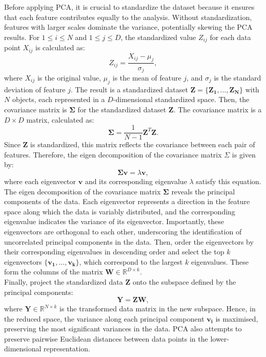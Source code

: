 \documentclass{article}\usepackage[]{graphicx}\usepackage[]{xcolor}
\numberwithin{equation}{section}
\begin{document}
{\noindent
Before applying PCA, it is crucial to standardize the dataset because it ensures that each feature contributes equally to the analysis. Without standardization, features with larger scales dominate the variance, potentially skewing the PCA results. For $1 \leq i \leq N$ and $1 \leq j \leq D$, the standardized value $Z_{ij}$ for each data point $X_{ij}$ is calculated as:
    \[Z_{ij} = \frac{X_{ij} - \mu_j}{\sigma_j},\]
where $X_{ij}$ is the original value, $\mu_j$ is the mean of feature $j$, and $\sigma_j$ is the standard deviation of feature $j$. The result is a standardized dataset $\mathbf{Z} = \{\mathbf{Z_1}, \dots, \mathbf{Z_N}\}$ with $N$ objects, each represented in a $D$-dimensional standardized space. Then, the covariance matrix is $\mathbf{\Sigma}$ for the standardized dataset $\mathbf{Z}$. The covariance matrix is a $D \times D$ matrix, calculated as:
    \[\mathbf{\Sigma} = \frac{1}{N-1} \mathbf{Z}^T \mathbf{Z}.\]
Since $\mathbf{Z}$ is standardized, this matrix reflects the covariance between each pair of features. Therefore, the eigen decomposition of the covariance matrix $\Sigma$ is given by:
    \[\mathbf{\Sigma} \mathbf{v} = \lambda \mathbf{v},\]
where each eigenvector $\mathbf{v}$ and its corresponding eigenvalue $\lambda$ satisfy this equation. The eigen decomposition of the covariance matrix $\mathbf{\Sigma}$ reveals the principal components of the data. Each eigenvector represents a direction in the feature space along which the data is variably distributed, and the corresponding eigenvalue indicates the variance of its eigenvector. Importantly, these eigenvectors are orthogonal to each other, underscoring the identification of uncorrelated principal components in the data. Then, order the eigenvectors by their corresponding eigenvalues in descending order and select the top $k$ eigenvectors $\{\mathbf{v_1}, \ldots, \mathbf{v_k}\}$, which correspond to the largest $k$ eigenvalues. These form the columns of the matrix $\mathbf{W} \in \mathbb{R}^{D \times k}$.\\

\noindent
Finally, project the standardized data $\mathbf{Z}$ onto the subspace defined by the principal components:
    \[\mathbf{Y} = \mathbf{Z}\mathbf{W},\]
where $\mathbf{Y} \in \mathbb{R}^{N \times k}$ is the transformed data matrix in the new subspace. Hence, in the reduced space, the variance along each principal component $\mathbf{v_i}$ is maximised, preserving the most significant variances in the data. PCA also attempts to preserve pairwise Euclidean distances between data points in the lower-dimensional representation. 

}
\end{document}
